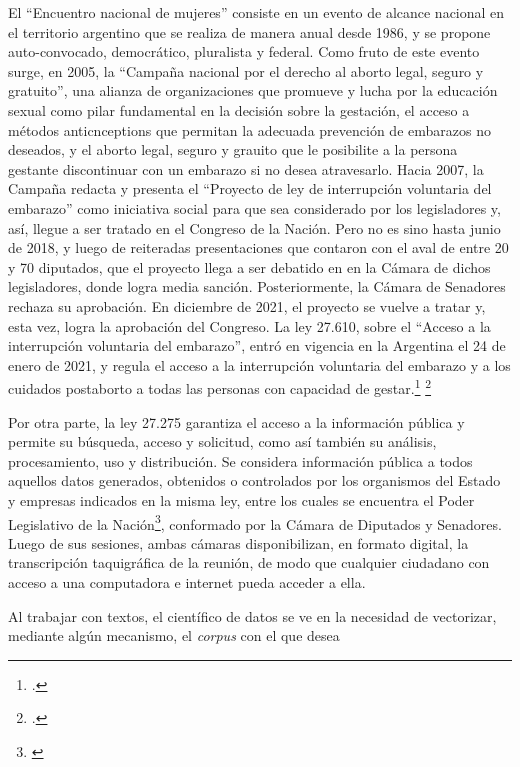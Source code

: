 El ``Encuentro nacional de mujeres'' consiste en un evento de alcance nacional
en el territorio argentino que se realiza de manera anual desde 1986, y se propone
auto-convocado, democrático, pluralista y federal.
Como fruto de este evento surge, en 2005, la ``Campaña nacional por el derecho al
aborto legal, seguro y gratuito'', una alianza de organizaciones que promueve y
lucha por la educación sexual como pilar fundamental en la decisión sobre la gestación,
el acceso a métodos anticnceptions que permitan la adecuada prevención de embarazos
no deseados, y el aborto legal, seguro y grauito que le posibilite a la persona gestante
discontinuar con un embarazo si no desea atravesarlo.
Hacia 2007, la Campaña redacta y presenta el ``Proyecto de ley de interrupción
voluntaria del embarazo'' como iniciativa social para que sea considerado por los
legisladores y, así, llegue a ser tratado en el Congreso de la Nación.
Pero no es sino hasta junio de 2018, y luego de reiteradas presentaciones que contaron
con el aval de entre 20 y 70 diputados, que el proyecto llega a ser debatido en en la
Cámara de dichos legisladores, donde logra media sanción.
Posteriormente, la Cámara de Senadores rechaza su aprobación.
En diciembre de 2021, el proyecto se vuelve a tratar y, esta vez, logra la aprobación
del Congreso.
La ley 27.610, sobre el ``Acceso a la interrupción voluntaria del embarazo'', entró
en vigencia en la Argentina el 24 de enero de 2021, y regula el acceso a la
interrupción voluntaria del embarazo y a los cuidados postaborto a todas
las personas con capacidad de gestar.\footnote{\citeauthor{campana@lalucha}.}
\footnote{\citeauthor{huesped@historia}.}
\par
Por otra parte, la ley 27.275 garantiza el acceso a la información pública y permite su búsqueda,
acceso y solicitud, como así también su análisis, procesamiento, uso y distribución.
Se considera información pública a todos aquellos datos generados, obtenidos o
controlados por los organismos del Estado y empresas indicados en la misma ley, entre
los cuales se encuentra el Poder Legislativo de la
Nación\footnote{\citeauthor{minjusticia@accesoinfo}}, conformado por la Cámara
de Diputados y Senadores.
Luego de sus sesiones, ambas cámaras disponibilizan, en formato digital, la
transcripción taquigráfica de la reunión, de modo que cualquier ciudadano con
acceso a una computadora e internet pueda acceder a ella.
\par
Al trabajar con textos, el científico de datos se ve en la necesidad
de vectorizar, mediante algún mecanismo, el \textit{corpus} con el que desea
